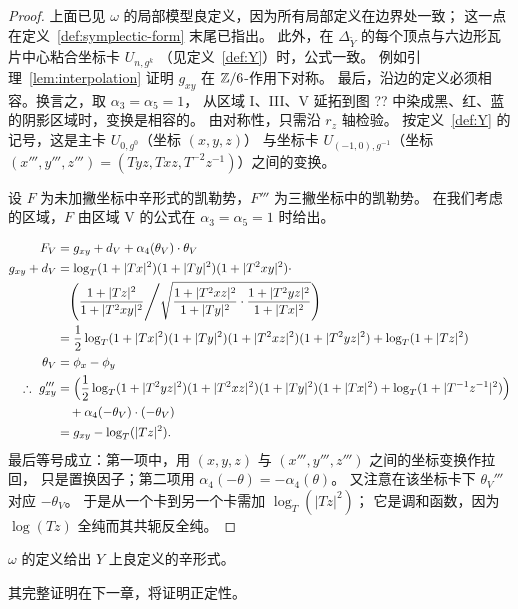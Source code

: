 \begin{proof}
上面已见 $\omega$ 的局部模型良定义，因为所有局部定义在边界处一致；
这一点在定义~\ref{def:symplectic-form} 末尾已指出。
此外，在 $\Delta_{\tilde Y}$ 的每个顶点与六边形瓦片中心粘合坐标卡 $U_{n,g^k}$
（见定义~\ref{def:Y}）时，公式一致。
例如引理~\ref{lem:interpolation} 证明 $g_{xy}$ 在 $\mathbb{Z}/6$-作用下对称。
最后，沿边的定义必须相容。换言之，取 $\alpha_3=\alpha_5=1$，
从区域 I、III、V 延拓到图 ?? 中染成黑、红、蓝的阴影区域时，变换是相容的。
由对称性，只需沿 $r_z$ 轴检验。
按定义~\ref{def:Y} 的记号，这是主卡 $U_{0,g^0}$（坐标 $(x,y,z)$）
与坐标卡 $U_{(-1,0),g^{-1}}$（坐标 $(x''',y''',z''')=(Tyz,Txz,T^{-2}z^{-1})$）之间的变换。

设 $F$ 为未加撇坐标中辛形式的凯勒势，$F'''$ 为三撇坐标中的凯勒势。
在我们考虑的区域，$F$ 由区域 V 的公式在 $\alpha_3=\alpha_5=1$ 时给出。

\begin{align*}
F_V&=g_{xy}+d_V+\alpha_4(\theta_V)\cdot\theta_V\\
g_{xy}+d_V&=\log_T(1+|Tx|^2)(1+|Ty|^2)(1+|T^2xy|^2)\cdot\\
&\quad\Biggl(\frac{1+|Tz|^2}{1+|T^2xy|^2}\Bigg/
\sqrt{\frac{1+|T^2xz|^2}{1+|Ty|^2}\cdot\frac{1+|T^2yz|^2}{1+|Tx|^2}}\Biggr)\\
&=\frac12\log_T(1+|Tx|^2)(1+|Ty|^2)(1+|T^2xz|^2)(1+|T^2yz|^2)
+\log_T(1+|Tz|^2)\\
\theta_V&=\phi_x-\phi_y\\
\therefore\ g'''_{xy}&=\Bigl(\frac12\log_T(1+|T^2yz|^2)(1+|T^2xz|^2)(1+|Ty|^2)(1+|Tx|^2)
+\log_T(1+|T^{-1}z^{-1}|^2)\Bigr)\\
&\quad+\alpha_4(-\theta_V)\cdot(-\theta_V)\\
&=g_{xy}-\log_T(|Tz|^2).
\end{align*}
最后等号成立：第一项中，用 $(x,y,z)$ 与 $(x''',y''',z''')$ 之间的坐标变换作拉回，
只是置换因子；第二项用 $\alpha_4(-\theta)=-\alpha_4(\theta)$。
又注意在该坐标卡下 $\theta_V'''$ 对应 $-\theta_V$。
于是从一个卡到另一个卡需加 $\log_T(|Tz|^2)$；
它是调和函数，因为 $\log(Tz)$ 全纯而其共轭反全纯。
\end{proof}


\begin{lemma}\label{lem:symplectic-on-Y}
$\omega$ 的定义给出 $Y$ 上良定义的辛形式。
\end{lemma}

其完整证明在下一章，将证明正定性。
